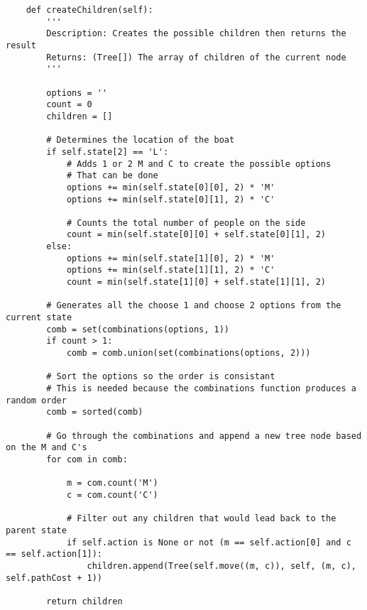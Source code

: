 \documentclass{article}
\begin{document}
\begin{verbatim}
    def createChildren(self):
        '''
        Description: Creates the possible children then returns the result
        Returns: (Tree[]) The array of children of the current node
        '''

        options = ''
        count = 0
        children = []

        # Determines the location of the boat
        if self.state[2] == 'L':
            # Adds 1 or 2 M and C to create the possible options
            # That can be done
            options += min(self.state[0][0], 2) * 'M'
            options += min(self.state[0][1], 2) * 'C'

            # Counts the total number of people on the side
            count = min(self.state[0][0] + self.state[0][1], 2)
        else:
            options += min(self.state[1][0], 2) * 'M'
            options += min(self.state[1][1], 2) * 'C'
            count = min(self.state[1][0] + self.state[1][1], 2)

        # Generates all the choose 1 and choose 2 options from the current state
        comb = set(combinations(options, 1))
        if count > 1:
            comb = comb.union(set(combinations(options, 2)))

        # Sort the options so the order is consistant
        # This is needed because the combinations function produces a random order
        comb = sorted(comb)

        # Go through the combinations and append a new tree node based on the M and C's
        for com in comb:

            m = com.count('M')
            c = com.count('C')

            # Filter out any children that would lead back to the parent state
            if self.action is None or not (m == self.action[0] and c == self.action[1]):
                children.append(Tree(self.move((m, c)), self, (m, c), self.pathCost + 1))

        return children
\end{verbatim}
\newpage
\end{document}
